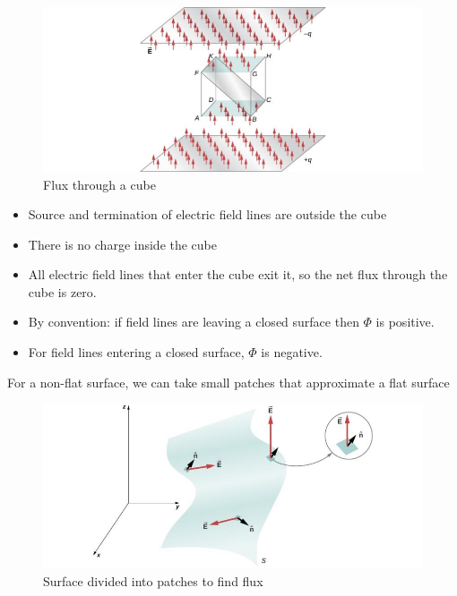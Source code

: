 \documentclass[14pt]{memoir}
\begin{document}
\begin{figure}[H]
\begin{center}
\includegraphics[scale=0.60]{fig/fig_06_07.jpg}
\caption{Flux through a cube}
\label{fig:06_07}
\end{center}
\end{figure}

\begin{itemize}
\item Source and termination of electric field lines are outside the cube
\item There is no charge inside the cube
\item All electric field lines that enter the cube exit it, so the net flux through the cube is zero.
\item By convention: if field lines are leaving a closed surface then $\Phi$ is positive. 
\item For field lines entering a closed surface, $\Phi$ is negative.
\end{itemize}

For a non-flat surface, we can take small patches that approximate a flat surface

\begin{figure}[H]
\begin{center}
\includegraphics[scale=0.60]{fig/fig_06_08.jpg}
\caption{Surface divided into patches to find flux}
\label{fig:06_08}
\end{center}
\end{figure}
\end{document}
